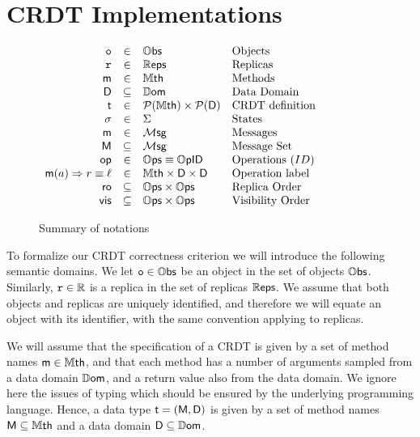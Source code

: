 
\section{CRDT Implementations}
\label{sec:CRDT implementations}

\begin{figure}
  \centering

  \(
  \begin{array}[t]{rcll}
    \aobj & \in  & \objs & \text{Objects} \\
    \arep & \in & \reps & \text{Replicas} \\
    \amethod & \in & \methods & \text{Methods}\\
    \adomain & \subseteq & \datadomain & \text{Data Domain} \\
    \acrdttyp & \in & \powerset{\methods} \times \powerset{\adomain} & \text{CRDT definition} \\
    \astate & \in & \states & \text{States} \\
    \amesg & \in & \messages & \text{Messages} \\
    \amesgset & \subseteq & \messages & \text{Message Set} \\
    \aop & \in & \ops \equiv \opids & \text{Operations}\ (ID) \\
    \alabellong[\amethod]{\argv}{\retv} \equiv \alabel  & \in & \methods \times \adomain \times \adomain & \text{Operation label} \\
    \arepord & \subseteq & \ops \times \ops & \text{Replica Order} \\
    \avisord & \subseteq & \ops \times \ops & \text{Visibility Order}
  \end{array}
  \)
  \caption{Summary of notations}
  \label{fig:notations}
\end{figure}


To formalize our CRDT correctness criterion we will introduce the
following semantic domains.
%
We let $\mathtt{o} \in \mathbb{O}\mathsf{bs}$ be an object in the set of objects $\mathbb{O}\mathsf{bs}$. Similarly,
$\mathtt{r} \in \mathbb{R}$ is a replica in the set of replicas
$\mathbb{R}\mathsf{eps}$.
We assume that both objects and replicas are uniquely identified, and
therefore we will equate an object with its identifier, with the same
convention applying to replicas.

We will assume that the specification of a CRDT is given by a set of
method names $\mathsf{m} \in \mathbb{M}\mathsf{th}$, and that each method has a
number of arguments sampled from a data domain $\mathbb{D}\mathsf{om}$, and a
return value also from the data domain.
We ignore here the issues of typing which should be ensured by the
underlying programming language.
Hence, a data type $\mathsf{t} = (\mathsf{M}, \mathsf{D})$ is given by a
set of method names $\mathsf{M} \subseteq \mathbb{M}\mathsf{th}$ and a data domain
$\mathsf{D} \subseteq \mathbb{D}\mathsf{om}$.

